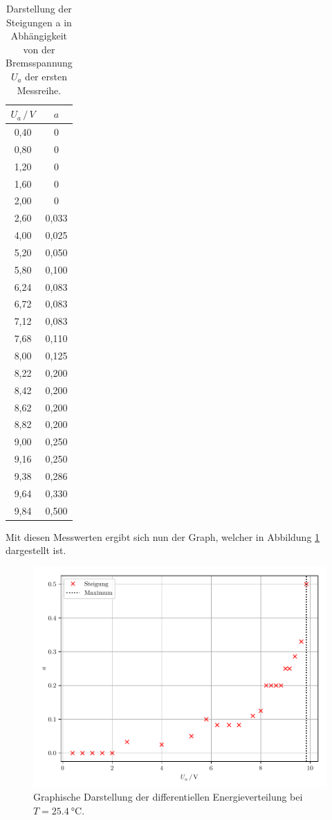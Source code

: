\begin{table}[H]
  \centering
  \caption{Darstellung der Steigungen a in Abhängigkeit von der Bremsspannung $U_a$
  der ersten Messreihe.}
  \label{tab:2}
  \begin{tabular}{c c}
    \toprule
    $U_a \, / \, V$ & $a$ \\
    \midrule
    0,40 & 0 \\
    0,80 & 0 \\
    1,20 & 0 \\
    1,60 & 0 \\
    2,00 & 0 \\
    2,60 & 0,033  \\
    4,00 & 0,025  \\
    5,20 & 0,050  \\
    5,80 & 0,100  \\
    6,24 & 0,083  \\
    6,72 & 0,083  \\
    7,12 & 0,083  \\
    7,68 & 0,110  \\
    8,00 & 0,125  \\
    8,22 & 0,200  \\
    8,42 & 0,200  \\
    8,62 & 0,200  \\
    8,82 & 0,200  \\
    9,00 & 0,250  \\
    9,16 & 0,250  \\
    9,38 & 0,286  \\
    9,64 & 0,330   \\
    9,84 & 0,500    \\
    \bottomrule
  \end{tabular}
\end{table}

Mit diesen Messwerten ergibt sich nun der Graph, welcher in Abbildung \ref{abb:4}
dargestellt ist.

\begin{figure}[H]
  \centering
  \includegraphics[width=\textwidth]{plot1.pdf}
  \caption{Graphische Darstellung der differentiellen Energieverteilung bei $T = \SI{25.4}{\celsius}$.}
  \label{abb:4}
\end{figure}

